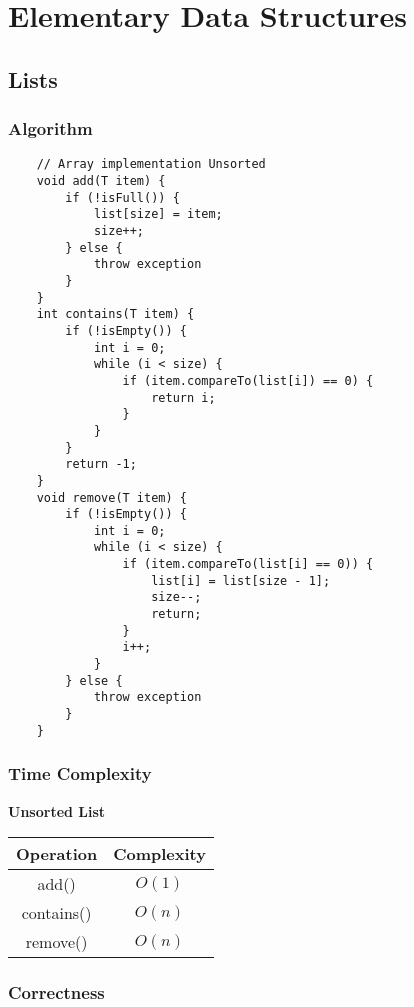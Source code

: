 \documentclass[10pt, 
a4paper, 
oneside, 
headinclude, footinclude, 
BCOR5mm]
{scrartcl}
\begin{document}
\section{Elementary Data Structures}
\subsection{Lists}
\subsubsection{Algorithm}
\begin{lstlisting}
    // Array implementation Unsorted
    void add(T item) {
        if (!isFull()) {
            list[size] = item;
            size++;
        } else {
            throw exception
        }
    }
    int contains(T item) {
        if (!isEmpty()) {
            int i = 0;
            while (i < size) {
                if (item.compareTo(list[i]) == 0) {
                    return i;
                }
            }
        }
        return -1;
    }
    void remove(T item) {
        if (!isEmpty()) {
            int i = 0;
            while (i < size) {
                if (item.compareTo(list[i] == 0)) {
                    list[i] = list[size - 1];
                    size--;
                    return;
                }
                i++;
            }
        } else {
            throw exception
        }
    }
\end{lstlisting}
\subsubsection{Time Complexity}
\textbf{Unsorted List}
\begin{center}
    \begin{tabular}{|c|c|}
        \hline
        \textbf{Operation} & \textbf{Complexity} \\
        \hline
        add() & $O(1)$ \\
        \hline
        contains() & $O(n)$ \\
        \hline
        remove() & $O(n)$ \\
        \hline
    \end{tabular}
\end{center}
\subsubsection{Correctness}
\newpage
\end{document}
